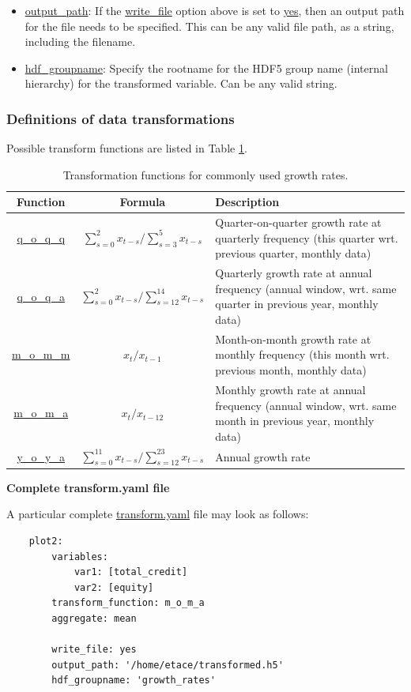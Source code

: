 \documentclass[10pt,a4paper]{article}
\begin{document}
\begin{itemize}
\item \url{output_path}: If the \url{write_file} option above is set to \url{yes}, then an output path for the file needs to be specified.
This can be any valid file path, as a string, including the filename.

\item \url{hdf_groupname}: Specify the rootname for the HDF5 group name (internal hierarchy) for the transformed variable. Can be any valid string.
\end{itemize}

\subsubsection{Definitions of data transformations}
Possible transform functions are listed in Table \ref{Table: Transformation}.

\begin{table}[hbt!]
\label{Table: Transformation}
\begin{tabular}{|c|c|l|}
\hline \hline 
Function & Formula & Description\\
\hline 
\url{q_o_q_q} & $\sum_{s=0}^2 x_{t-s}/\sum_{s=3}^5 x_{t-s}$ & \parbox{7cm}{Quarter-on-quarter growth rate at quarterly frequency (this quarter wrt. previous quarter, monthly data)} \\ 
\hline 
\url{q_o_q_a} & $\sum_{s=0}^2 x_{t-s}/\sum_{s=12}^{14} x_{t-s}$ & \parbox{7cm}{Quarterly growth rate at annual frequency (annual window, wrt. same quarter in previous year, monthly data)} \\ 
\hline 
\url{m_o_m_m} & $x_{t}/x_{t-1}$ &  \parbox{7cm}{Month-on-month growth rate at monthly frequency (this month wrt. previous month, monthly data)} \\ 
\hline 
\url{m_o_m_a} & $x_{t}/x_{t-12}$ & \parbox{7cm}{Monthly growth rate at annual frequency (annual window,  wrt. same month in previous year, monthly data)} \\ 
\hline 
\url{y_o_y_a} & $\sum_{s=0}^{11} x_{t-s}/\sum_{s=12}^{23} x_{t-s}$ & \parbox{7cm}{Annual growth rate} \\ 
\hline 
\end{tabular} 
\caption{Transformation functions for commonly used growth rates.}
\end{table}


\bigskip
\textbf{Complete transform.yaml file}

A particular complete \url{transform.yaml} file may look as follows:
\begin{lstlisting}
    plot2:
        variables: 
            var1: [total_credit]
            var2: [equity]       
        transform_function: m_o_m_a
        aggregate: mean    
     
        write_file: yes
        output_path: '/home/etace/transformed.h5'
        hdf_groupname: 'growth_rates'
\end{lstlisting}
\end{document}
